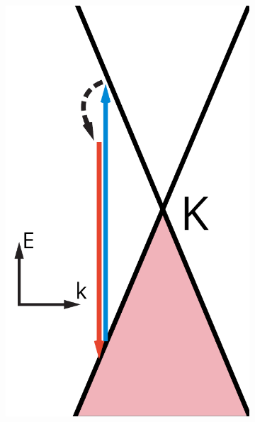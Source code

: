 \begin{figure}[!h]
  \centering
  \begin{subfigure}[t]{0.2\textwidth}
    \caption{}
    \includegraphics[width=\textwidth]{./images/g-mode.pdf}
  \end{subfigure}
  \qquad
  \begin{subfigure}[t]{0.45\textwidth}
    \caption{}

\end{subfigure}
\end{figure}
